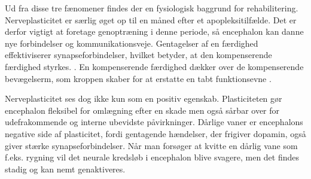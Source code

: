 Ud fra disse tre fænomener findes der en fysiologisk baggrund for rehabilitering. Nerveplasticitet er særlig øget op til en måned efter et apopleksitilfælde. Det er derfor vigtigt at foretage genoptræning i denne periode, så encephalon kan danne nye forbindelser og kommunikationsveje. \cite{Rugnett2015} Gentagelser af en færdighed effektiviserer synapseforbindelser, hvilket betyder, at den kompenserende færdighed styrkes. \cite{Stanfield2014}. En kompenserende færdighed dækker over de kompenserende bevægelserm, som kroppen skaber for at erstatte en tabt funktionsevne \cite{Takeuchi2012,Leea2009}.

Nerveplasticitet ses dog ikke kun som en positiv egenskab. Plasticiteten gør encephalon fleksibel for omlægning efter en skade men også sårbar over for udefrakommende og interne ubevidste påvirkninger. Dårlige vaner er encephalons negative side af plasticitet, fordi gentagende hændelser, der frigiver dopamin, også giver stærke synapseforbindelser. Når man forsøger at kvitte en dårlig vane som f.eks. rygning vil det neurale kredsløb i encephalon blive svagere, men det findes stadig og kan nemt genaktiveres. \cite{Hampton2015}




